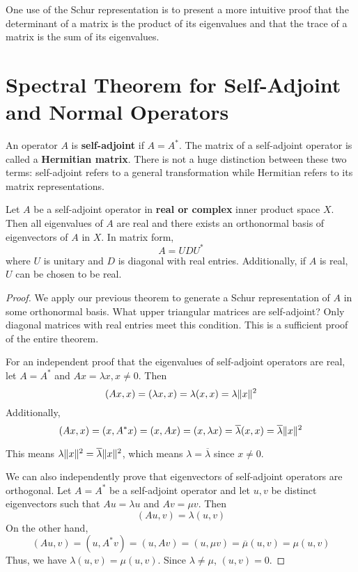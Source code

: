 One use of the Schur representation is to present a more intuitive proof that the determinant of a matrix is the product of its eigenvalues and that the trace of a matrix is the sum of its eigenvalues. 

\section{Spectral Theorem for Self-Adjoint and Normal Operators}

\begin{definition}
An operator $A$ is \textbf{self-adjoint} if $A = A^{*}$. The matrix of a self-adjoint operator is called a \textbf{Hermitian matrix}. There is not a huge distinction between these two terms: self-adjoint refers to a general transformation while Hermitian refers to its matrix representations.
\end{definition}

\begin{theorem}
Let $A$ be a self-adjoint operator in \textbf{real or complex} inner product space $X$. Then all eigenvalues of $A$ are real and there exists an orthonormal basis of eigenvectors of $A$ in $X$. In matrix form, 
$$A = UDU^{*}$$
where $U$ is unitary and $D$ is diagonal with real entries. Additionally, if $A$ is real, $U$ can be chosen to be real. 
\end{theorem}

\begin{proof}
We apply our previous theorem to generate a Schur representation of $A$ in some orthonormal basis. What upper triangular matrices are self-adjoint? Only diagonal matrices with real entries meet this condition. This is a sufficient proof of the entire theorem. 

For an independent proof that the eigenvalues of self-adjoint operators are real, let $A = A^{*}$ and $Ax = \lambda x, x \neq 0$. Then 
$$(Ax, x) = (\lambda x, x) = \lambda (x, x) = \lambda \lVert x\rVert^{2}$$
Additionally, 
$$(Ax, x) = (x, A^{*}x) = (x, Ax) = (x, \lambda x) = \overline{\lambda} (x, x) = \overline{\lambda} \lVert x\rVert^{2}$$

This means $\lambda \lVert x\rVert^{2} = \overline{\lambda} \lVert x\rVert^{2}$, which means $\lambda = \overline{\lambda}$ since $x \neq 0$. 

We can also independently prove that eigenvectors of self-adjoint operators are orthogonal. Let $A = A^{*}$ be a self-adjoint operator and let $u, v$ be distinct eigenvectors such that $Au = \lambda u$ and $Av = \mu v$. Then 
$$(Au, v) = \lambda (u, v)$$ 
On the other hand, 
$$(Au, v) = (u, A^{*} v) = (u, Av) = (u, \mu v) = \overline{\mu} (u, v) = \mu (u, v)$$
Thus, we have $\lambda (u, v) = \mu (u, v)$. Since $\lambda \neq \mu$, $(u, v) = 0$. 
\end{proof}

